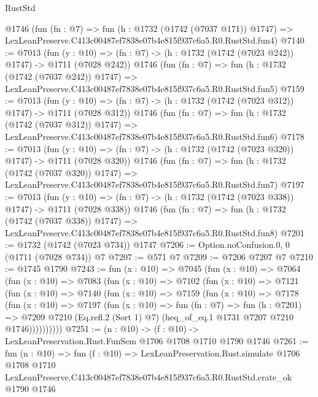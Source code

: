 \begin{lexlean}{RustStd}
\begin{coremodule}
    @1746
    (fun (fn : @7) =>
    fun (h : @1732 (@1742 (@7037 @171)) @1747) =>
    LexLeanPreserve.C413c00487ef7838e07b4e815f937c6a5.R0.RustStd.fun4)
@7140 := @7013
    (fun (y : @10) => (fn : @7) -> (h : @1732 (@1742 (@7023 @242)) @1747) -> @1711 (@7028 @242))
    @1746
    (fun (fn : @7) =>
    fun (h : @1732 (@1742 (@7037 @242)) @1747) =>
    LexLeanPreserve.C413c00487ef7838e07b4e815f937c6a5.R0.RustStd.fun5)
@7159 := @7013
    (fun (y : @10) => (fn : @7) -> (h : @1732 (@1742 (@7023 @312)) @1747) -> @1711 (@7028 @312))
    @1746
    (fun (fn : @7) =>
    fun (h : @1732 (@1742 (@7037 @312)) @1747) =>
    LexLeanPreserve.C413c00487ef7838e07b4e815f937c6a5.R0.RustStd.fun6)
@7178 := @7013
    (fun (y : @10) => (fn : @7) -> (h : @1732 (@1742 (@7023 @320)) @1747) -> @1711 (@7028 @320))
    @1746
    (fun (fn : @7) =>
    fun (h : @1732 (@1742 (@7037 @320)) @1747) =>
    LexLeanPreserve.C413c00487ef7838e07b4e815f937c6a5.R0.RustStd.fun7)
@7197 := @7013
    (fun (y : @10) => (fn : @7) -> (h : @1732 (@1742 (@7023 @338)) @1747) -> @1711 (@7028 @338))
    @1746
    (fun (fn : @7) =>
    fun (h : @1732 (@1742 (@7037 @338)) @1747) =>
    LexLeanPreserve.C413c00487ef7838e07b4e815f937c6a5.R0.RustStd.fun8)
@7201 := @1732 (@1742 (@7023 @734)) @1747
@7206 := Option.noConfusion.{0, 0} (@1711 (@7028 @734)) @7
@7207 := @571 @7
@7209 := @7206 @7207 @7
@7210 := @1745 @1790
@7243 := fun (x : @10) =>
  @7045
    (fun (x : @10) =>
    @7064
      (fun (x : @10) =>
      @7083
        (fun (x : @10) =>
        @7102
          (fun (x : @10) =>
          @7121
            (fun (x : @10) =>
            @7140
              (fun (x : @10) =>
              @7159
                (fun (x : @10) =>
                @7178
                  (fun (x : @10) =>
                  @7197
                    (fun (x : @10) =>
                    fun (fn : @7) =>
                    fun (h : @7201) =>
                    @7209
                      @7210
                      (Eq.refl.{2} (Sort 1) @7)
                      (heq_of_eq.{1} @1731 @7207 @7210 @1746))))))))))
@7251 := (n : @10) -> (f : @10) -> LexLeanPreservation.Rust.FunSem @1706 @1708 @1710 @1790 @1746
@7261 := fun (n : @10) =>
  fun (f : @10) =>
  LexLeanPreservation.Rust.simulate
    @1706
    @1708
    @1710
    LexLeanPreserve.C413c00487ef7838e07b4e815f937c6a5.R0.RustStd.crate_ok
    @1790
    @1746
\end{coremodule}
\end{lexlean}
